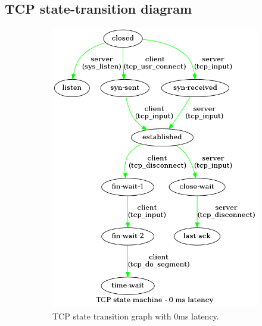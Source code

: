 \documentclass[a4paper,10pt]{article}
\begin{document}
\subsection{TCP state-transition diagram}
\begin{figure}[]
\begin{subfigure}{.30\textwidth}
    \centering
    \includegraphics[width=\textwidth]{images/TCP_state_machine_0_ms.png}
    \caption{TCP state transition graph with 0ms latency.}
    \label{fig:0ms_latency}
\end{subfigure}%
\qquad
\begin{subfigure}{.30\textwidth}
   \centering

\end{subfigure}
\end{figure}
\end{document}
